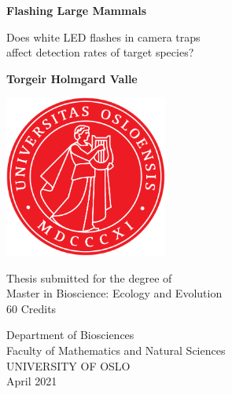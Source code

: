 \begin{titlepage}
   \begin{center}
       \vspace*{1cm}

		\Huge
       \textbf{Flashing Large Mammals}

       \vspace{0.4cm}
       \LARGE
        Does white LED flashes in camera traps \\
        affect detection rates of target species?
            
       \vspace{0.6cm}
	\large
       \textbf{Torgeir Holmgard Valle}

       \vfill
     
       \includegraphics[width=0.4\textwidth]{img/UiO_logo.png}
       
       \vspace{2cm}
            
       \Large
       Thesis submitted for the degree of \\
       Master in Bioscience: Ecology and Evolution \\
       60 Credits
            
       \vspace{0.4cm}
       
       Department of Biosciences\\
       Faculty of Mathematics and Natural Sciences\\
       
       UNIVERSITY OF OSLO\\
       
       \vspace{0.4cm}
		April 2021
            
   \end{center}
\end{titlepage}
\thispagestyle{plain}
\cleardoublepage
